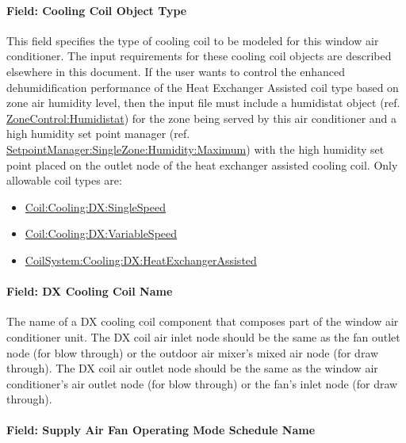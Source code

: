 \paragraph{Field: Cooling Coil Object Type}\label{field-cooling-coil-object-type-2-001}

This field specifies the type of cooling coil to be modeled for this window air conditioner. The input requirements for these cooling coil objects are described elsewhere in this document. If the user wants to control the enhanced dehumidification performance of the Heat Exchanger Assisted coil type based on zone air humidity level, then the input file must include a humidistat object (ref. \hyperref[zonecontrolhumidistat]{ZoneControl:Humidistat}) for the zone being served by this air conditioner and a high humidity set point manager (ref. \hyperref[setpointmanagersinglezonehumiditymaximum]{SetpointManager:SingleZone:Humidity:Maximum}) with the high humidity set point placed on the outlet node of the heat exchanger assisted cooling coil. Only allowable coil types are:

\begin{itemize}
\item
  \hyperref[coilcoolingdxsinglespeed]{Coil:Cooling:DX:SingleSpeed}
\item
  \hyperref[coilcoolingdxvariablespeed]{Coil:Cooling:DX:VariableSpeed}
\item
  \hyperref[coilsystemcoolingdxheatexchangerassisted]{CoilSystem:Cooling:DX:HeatExchangerAssisted}
\end{itemize}

\paragraph{Field: DX Cooling Coil Name}\label{field-dx-cooling-coil-name}

The name of a DX cooling coil component that composes part of the window air conditioner unit. The DX coil air inlet node should be the same as the fan outlet node (for blow through) or the outdoor air mixer's mixed air node (for draw through). The DX coil air outlet node should be the same as the window air conditioner's air outlet node (for blow through) or the fan's inlet node (for draw through).

\paragraph{Field: Supply Air Fan Operating Mode Schedule Name}\label{field-supply-air-fan-operating-mode-schedule-name-3-000}


